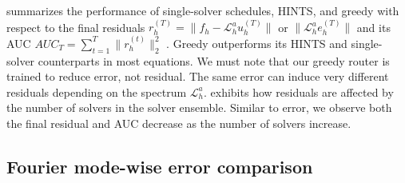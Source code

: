 \documentclass{article}
\begin{document}
\begin{table}[H]
    \centering
    \caption{Final residual and AUC of squared $L^2$ residual for varying numbers of solvers. Values are mean ($\pm$ standard error (s.e.)) over 128 test instances; both mean and s.e. are reported in $\times 10^{-3}$.}
    \label{tab:residualcomparison2}
\end{table}


 summarizes the performance of single-solver schedules, HINTS, and greedy with respect to the final residuals $r_h^{(T)} =\|f_h - \mathcal{L}_h^a u_h^{(T)}\|$ or $\|\mathcal{L}_h^a e_h^{(T)}\|$ and its AUC $AUC_T = \sum_{t = 1}^T\|r^{(t)}_h\|^2_2$ . Greedy outperforms its HINTS and single-solver counterparts in most equations. We must note that our greedy router is trained to reduce error, not residual. The same error can induce very different residuals depending on the spectrum $\mathcal{L}_h^a$.  exhibits how residuals are affected by the number of solvers in the solver ensemble. Similar to error, we observe both the final residual and AUC decrease as the number of solvers increase.



\subsection{Fourier mode-wise error comparison} \label{sec:fouriermodeerrorcomparison}
\end{document}
